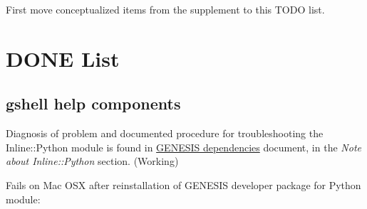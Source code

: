 \documentclass[12pt]{article}
\begin{document}
First move conceptualized items from the supplement to this TODO list.


\section{DONE List}

\subsection{gshell help components}

Diagnosis of problem and documented procedure for troubleshooting the Inline::Python module is found in \href{../genesis-dependencies/genesis-dependencies.tex}{GENESIS dependencies} document, in the {\it Note about Inline::Python} section. (Working)

Fails on Mac OSX after reinstallation of GENESIS developer package for Python module:
\end{document}

